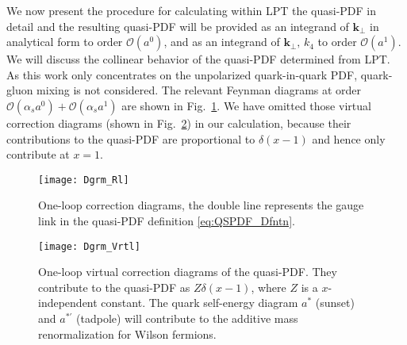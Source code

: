 \documentclass[english,preprint,aps,prd,showpacs,superscriptaddress,nofootinbib,tightenlines]{revtex4}
\begin{document}
We now present the procedure for calculating within LPT
the quasi-PDF in detail and the resulting quasi-PDF will be provided
as an integrand of $\boldsymbol{k}_{\perp}$ in analytical form to order $\mathcal{O}\left(a^{0}\right)$, and as an integrand of $\boldsymbol{k}_{\perp},\,k_{4}$ to
order $\mathcal{O}\left(a^{1}\right)$. We will discuss the collinear
behavior of the quasi-PDF determined from LPT. As this work only
concentrates on the unpolarized quark-in-quark PDF, quark-gluon mixing
is not considered. The relevant Feynman diagrams at order $\mathcal{O}\left(\alpha_{s}a^{0}\right)+\mathcal{O}\left(\alpha_{s}a^{1}\right)$
are shown in Fig.~\ref{fig:One-loop-real-correction}. We have
omitted those virtual correction diagrams (shown in Fig.~\ref{fig:One-loop-virtual-correction}) in our calculation, because their contributions
to the quasi-PDF are proportional to $\delta\left(x-1\right)$ and hence only
contribute at $x=1$.
\begin{center}
\begin{figure}[H]
\centering{}\texttt{[image: Dgrm\_Rl]}\caption{One-loop correction diagrams, the  double line represents the gauge link in the quasi-PDF definition \eqref{eq:QSPDF_Dfntn}.  \label{fig:One-loop-real-correction}}
\end{figure}
\par\end{center}
\begin{center}
\begin{figure}[H]
\centering{}\texttt{[image: Dgrm\_Vrtl]}\caption{One-loop virtual correction diagrams of the quasi-PDF. They contribute to the quasi-PDF as $Z\delta(x-1)$, where $Z$ is a $x$-independent constant. The quark self-energy diagram $a^*$ (sunset) and $a^{*'}$ (tadpole) will contribute to the additive mass renormalization for Wilson fermions.}
\label{fig:One-loop-virtual-correction}
\end{figure}
\par\end{center}
\end{document}
